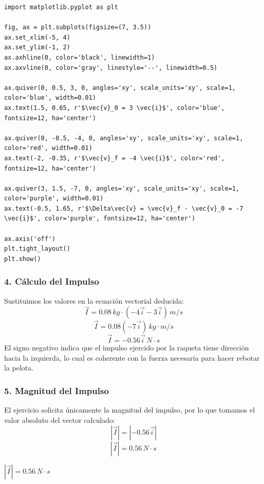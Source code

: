 \documentclass[12pt, a4paper]{article}
\begin{document}
\begin{lstlisting}
import matplotlib.pyplot as plt

fig, ax = plt.subplots(figsize=(7, 3.5))
ax.set_xlim(-5, 4)
ax.set_ylim(-1, 2)
ax.axhline(0, color='black', linewidth=1)
ax.axvline(0, color='gray', linestyle='--', linewidth=0.5)

ax.quiver(0, 0.5, 3, 0, angles='xy', scale_units='xy', scale=1, color='blue', width=0.01)
ax.text(1.5, 0.65, r'$\vec{v}_0 = 3 \vec{i}$', color='blue', fontsize=12, ha='center')

ax.quiver(0, -0.5, -4, 0, angles='xy', scale_units='xy', scale=1, color='red', width=0.01)
ax.text(-2, -0.35, r'$\vec{v}_f = -4 \vec{i}$', color='red', fontsize=12, ha='center')

ax.quiver(3, 1.5, -7, 0, angles='xy', scale_units='xy', scale=1, color='purple', width=0.01)
ax.text(-0.5, 1.65, r'$\Delta\vec{v} = \vec{v}_f - \vec{v}_0 = -7 \vec{i}$', color='purple', fontsize=12, ha='center')

ax.axis('off')
plt.tight_layout()
plt.show()
\end{lstlisting}

\subsubsection*{4. Cálculo del Impulso}
Sustituimos los valores en la ecuación vectorial deducida:
\[ \vec{I} = 0.08 \, \si{kg} \cdot (-4 \vec{i} - 3 \vec{i}) \, \si{m/s} \]
\[ \vec{I} = 0.08 (-7 \vec{i}) \, \si{kg\cdot m/s} \]
\[ \vec{I} = -0.56 \vec{i} \, \si{N\cdot s} \]
El signo negativo indica que el impulso ejercido por la raqueta tiene dirección hacia la izquierda, lo cual es coherente con la fuerza necesaria para hacer rebotar la pelota.

\subsubsection*{5. Magnitud del Impulso}
El ejercicio solicita únicamente la magnitud del impulso, por lo que tomamos el valor absoluto del vector calculado:
\[ |\vec{I}| = |-0.56 \vec{i}| \]
\[ |\vec{I}| = 0.56 \, \si{N\cdot s} \]

\begin{tcolorbox}[colback=green!5!white, colframe=green!50!black, title=Respuesta Final]
\centering \Large $|\vec{I}| = 0.56 \, \si{N\cdot s}$
\end{tcolorbox}

\newpage
\end{document}
